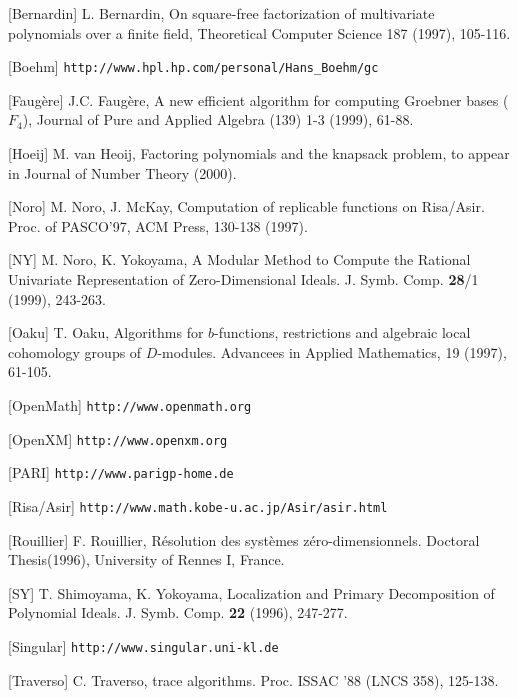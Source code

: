 \begin{slide}{}

[Bernardin] L. Bernardin, On square-free factorization of 
multivariate polynomials over a finite field, Theoretical
Computer Science 187 (1997), 105-116.

[Boehm] {\tt http://www.hpl.hp.com/personal/Hans\_Boehm/gc}

[Faug\`ere] J.C. Faug\`ere,
A new efficient algorithm for computing Groebner bases  ($F_4$),
Journal of Pure and Applied Algebra (139) 1-3 (1999), 61-88.

[Hoeij] M. van Heoij, Factoring polynomials and the knapsack problem,
to appear in Journal of Number Theory (2000).

[Noro] M. Noro, J. McKay,
Computation of replicable functions on Risa/Asir.
Proc. of PASCO'97, ACM Press, 130-138 (1997).

[NY] M. Noro, K. Yokoyama, 
A Modular Method to Compute the Rational Univariate
Representation of Zero-Dimensional Ideals.
J. Symb. Comp. {\bf 28}/1 (1999), 243-263.
\end{slide}

\begin{slide}{}

[Oaku] T. Oaku, Algorithms for $b$-functions, restrictions and algebraic
local cohomology groups of $D$-modules.
Advancees in Applied Mathematics, 19 (1997), 61-105.

[OpenMath] {\tt http://www.openmath.org}

[OpenXM] {\tt http://www.openxm.org}

[PARI] {\tt http://www.parigp-home.de}

[Risa/Asir] {\tt http://www.math.kobe-u.ac.jp/Asir/asir.html}

[Rouillier] F. Rouillier,
R\'esolution des syst\`emes z\'ero-dimensionnels. 
Doctoral Thesis(1996), University of Rennes I, France.

[SY] T. Shimoyama, K. Yokoyama, Localization and Primary Decomposition of Polynomial Ideals.  J. Symb. Comp. {\bf 22} (1996), 247-277.

[Singular] {\tt http://www.singular.uni-kl.de}

[Traverso] C. Traverso, \gr trace algorithms. Proc. ISSAC '88 (LNCS 358), 125-138.

\end{slide}

\begin{slide}{}
\begin{center}
\end{center}
\end{slide}

